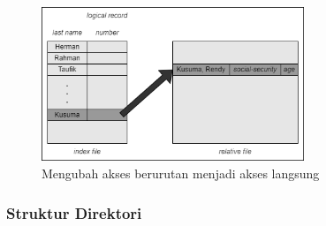 \documentclass[12pt]{article}
\begin{document}
\begin{itemize}
\begin{figure}[h]
			\centering
			\includegraphics[width=0.7\textwidth]{asset/gambar5.png}
            \caption{Mengubah akses berurutan menjadi akses langsung}
        \end{figure}
    \end{itemize}
    \subsubsection{Struktur Direktori}
\end{document}
